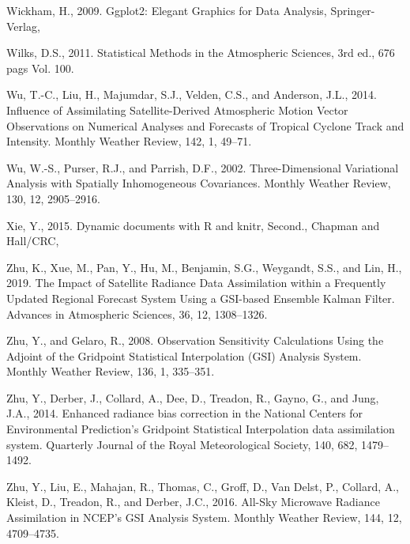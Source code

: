 \documentclass[12pt,oneside]{reedthesis}
\begin{document}
\leavevmode\hypertarget{ref-wickham2009}{}%
Wickham, H., 2009. Ggplot2: Elegant Graphics for Data Analysis, Springer-Verlag,

\leavevmode\hypertarget{ref-wilks2011}{}%
Wilks, D.S., 2011. Statistical Methods in the Atmospheric Sciences, 3rd ed., 676 pags Vol. 100.

\leavevmode\hypertarget{ref-wu2014}{}%
Wu, T.-C., Liu, H., Majumdar, S.J., Velden, C.S., and Anderson, J.L., 2014. Influence of Assimilating Satellite-Derived Atmospheric Motion Vector Observations on Numerical Analyses and Forecasts of Tropical Cyclone Track and Intensity. Monthly Weather Review, 142, 1, 49--71.

\leavevmode\hypertarget{ref-wu2002}{}%
Wu, W.-S., Purser, R.J., and Parrish, D.F., 2002. Three-Dimensional Variational Analysis with Spatially Inhomogeneous Covariances. Monthly Weather Review, 130, 12, 2905--2916.

\leavevmode\hypertarget{ref-xie2015}{}%
Xie, Y., 2015. Dynamic documents with R and knitr, Second., Chapman and Hall/CRC,

\leavevmode\hypertarget{ref-zhu2019}{}%
Zhu, K., Xue, M., Pan, Y., Hu, M., Benjamin, S.G., Weygandt, S.S., and Lin, H., 2019. The Impact of Satellite Radiance Data Assimilation within a Frequently Updated Regional Forecast System Using a GSI-based Ensemble Kalman Filter. Advances in Atmospheric Sciences, 36, 12, 1308--1326.

\leavevmode\hypertarget{ref-zhu2008}{}%
Zhu, Y., and Gelaro, R., 2008. Observation Sensitivity Calculations Using the Adjoint of the Gridpoint Statistical Interpolation (GSI) Analysis System. Monthly Weather Review, 136, 1, 335--351.

\leavevmode\hypertarget{ref-zhu2014}{}%
Zhu, Y., Derber, J., Collard, A., Dee, D., Treadon, R., Gayno, G., and Jung, J.A., 2014. Enhanced radiance bias correction in the National Centers for Environmental Prediction's Gridpoint Statistical Interpolation data assimilation system. Quarterly Journal of the Royal Meteorological Society, 140, 682, 1479--1492.

\leavevmode\hypertarget{ref-zhu2016}{}%
Zhu, Y., Liu, E., Mahajan, R., Thomas, C., Groff, D., Van Delst, P., Collard, A., Kleist, D., Treadon, R., and Derber, J.C., 2016. All-Sky Microwave Radiance Assimilation in NCEP's GSI Analysis System. Monthly Weather Review, 144, 12, 4709--4735.


\end{document}

